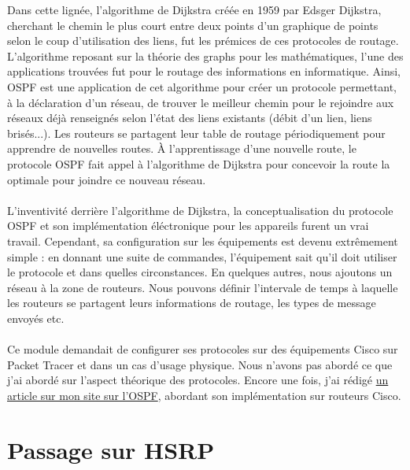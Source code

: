 Dans cette lignée, l'algorithme de Dijkstra créée en 1959 par Edsger Dijkstra, cherchant le chemin le plus court entre deux points d'un graphique de points selon le coup d'utilisation des liens, fut les prémices de ces protocoles de routage. L'algorithme reposant sur la théorie des graphs pour les mathématiques, l'une des applications trouvées fut pour le routage des informations en informatique. Ainsi, OSPF est une application de cet algorithme pour créer un protocole permettant, à la déclaration d'un réseau, de trouver le meilleur chemin pour le rejoindre aux réseaux déjà renseignés selon l'état des liens existants (débit d'un lien, liens brisés...). Les routeurs se partagent leur table de routage périodiquement pour apprendre de nouvelles routes. À l'apprentissage d'une nouvelle route, le protocole OSPF fait appel à l'algorithme de Dijkstra pour concevoir la route la optimale pour joindre ce nouveau réseau.
\\ \\
L'inventivité derrière l'algorithme de Dijkstra, la conceptualisation du protocole OSPF et son implémentation éléctronique pour les appareils furent un vrai travail. Cependant, sa configuration sur les équipements est devenu extrêmement simple : en donnant une suite de commandes, l'équipement sait qu'il doit utiliser le protocole et dans quelles circonstances. En quelques autres, nous ajoutons un réseau à la zone de routeurs. Nous pouvons définir l'intervale de temps à laquelle les routeurs se partagent leurs informations de routage, les types de message envoyés etc.
\\ \\
Ce module demandait de configurer ses protocoles sur des équipements Cisco sur Packet Tracer et dans un cas d'usage physique. Nous n'avons pas abordé ce que j'ai abordé sur l'aspect théorique des protocoles. Encore une fois, j'ai rédigé \href{http://xeylou.fr/posts/cisco-ospf/}{un article sur mon site sur l'OSPF}, abordant son implémentation sur routeurs Cisco.

\section{Passage sur HSRP}

